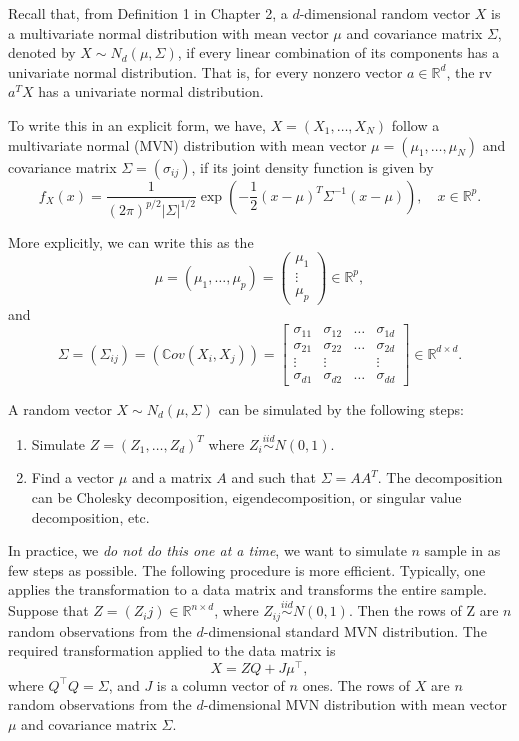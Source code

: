 \documentclass[
  letterpaper,
  DIV=11,
  numbers=noendperiod]{scrreprt}
\begin{document}
Recall that, from Definition 1 in Chapter 2, a \(d\)-dimensional random
vector \(X\) is a multivariate normal distribution with mean vector
\(\mu\) and covariance matrix \(\Sigma\), denoted by
\(X \sim N_d(\mu, \Sigma)\), if every linear combination of its
components has a univariate normal distribution. That is, for every
nonzero vector \(a \in \mathbb{R}^d\), the rv \(a^T X\) has a univariate
normal distribution.

To write this in an explicit form, we have, \(X = (X_1,\dots,X_N)\)
follow a multivariate normal (MVN) distribution with mean vector
\(\mu = (\mu_1,\dots,\mu_N)\) and covariance matrix
\(\Sigma = (\sigma_{ij})\), if its joint density function is given by \[
f_X(x) = \frac{1}{(2\pi)^{p/2} |\Sigma|^{1/2}} \exp\left(-\frac{1}{2}(x - \mu)^T \Sigma^{-1} (x - \mu)\right), \quad x \in \mathbb{R}^p.
\]

More explicitly, we can write this as the
\[\mu=(\mu_1,\dots,\mu_p) = \begin{pmatrix}\mu_1\\
\vdots\\
\mu_p\end{pmatrix}\in \mathbb{R}^p,\] and
\[\Sigma=(\Sigma_{ij}) = (\mathbb{C}ov(X_i,X_j))= \left[\begin{array}{cccc}
\sigma_{11} & \sigma_{12} & \ldots & \sigma_{1 d} \\
\sigma_{21} & \sigma_{22} & \ldots & \sigma_{2 d} \\
\vdots & \vdots & & \vdots \\
\sigma_{d 1} & \sigma_{d 2} & \ldots & \sigma_{d d}
\end{array}\right] \in \mathbb{R}^{d\times d}.
\]

A random vector \(X\sim N_d(\mu,\Sigma)\) can be simulated by the
following steps:

\begin{enumerate}
\def\labelenumi{\arabic{enumi}.}
\item
  Simulate \(Z = (Z_1,\ldots,Z_d)^T\) where
  \(Z_i \overset{iid}{\sim}N(0,1)\).
\item
  Find a vector \(\mu\) and a matrix \(A\) and such that
  \(\Sigma = AA^T\). The decomposition can be Cholesky decomposition,
  eigendecomposition, or singular value decomposition, etc.
\end{enumerate}

In practice, we \emph{do not do this one at a time}, we want to simulate
\(n\) sample in as few steps as possible. The following procedure is
more efficient. Typically, one applies the transformation to a data
matrix and transforms the entire sample. Suppose that
\(Z = (Z_ij ) \in \mathbb{R}^{n\times d}\), where
\(Z_{ij}\overset{iid}{\sim}N(0,1)\). Then the rows of Z are \(n\) random
observations from the \(d\)-dimensional standard MVN distribution. The
required transformation applied to the data matrix is
\[X = ZQ + J \mu^\top,\] where \(Q^\top Q=\Sigma\), and \(J\) is a
column vector of \(n\) ones. The rows of \(X\) are \(n\) random
observations from the \(d\)-dimensional MVN distribution with mean
vector \(\mu\) and covariance matrix \(\Sigma\).
\end{document}
